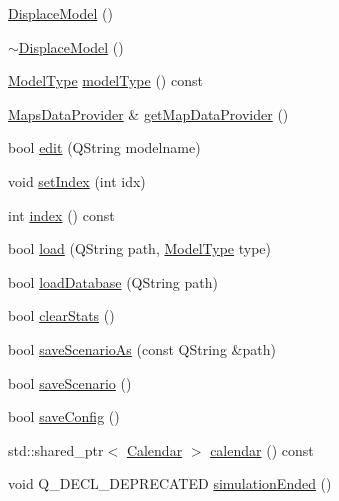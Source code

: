 \begin{DoxyCompactItemize}
\item 
\mbox{\hyperlink{class_displace_model_af29ae4dea3e66ed8a83200e6314cb12e}{Displace\+Model}} ()
\item 
\mbox{\hyperlink{class_displace_model_a2fd27dbc798b2037cb2edffd46d5126a}{$\sim$\+Displace\+Model}} ()
\item 
\mbox{\hyperlink{class_displace_model_aa89dfe820a935c7ec328dd8fc5c7c8cf}{Model\+Type}} \mbox{\hyperlink{class_displace_model_af2bf1482ae14c7edf00ef3a054af7f90}{model\+Type}} () const
\item 
\mbox{\hyperlink{class_maps_data_provider}{Maps\+Data\+Provider}} \& \mbox{\hyperlink{class_displace_model_a5cc5b78119476b37fecea821a50ccae6}{get\+Map\+Data\+Provider}} ()
\item 
bool \mbox{\hyperlink{class_displace_model_aa7fbc461966b5a61e8315a65d4b0c528}{edit}} (Q\+String modelname)
\item 
void \mbox{\hyperlink{class_displace_model_ac28610f27af7797d7d21937688c8d229}{set\+Index}} (int idx)
\item 
int \mbox{\hyperlink{class_displace_model_a7b72dd7bd7feb010720a35f080f23407}{index}} () const
\item 
bool \mbox{\hyperlink{class_displace_model_a50db8756e61d3c88daca0779c435191d}{load}} (Q\+String path, \mbox{\hyperlink{class_displace_model_aa89dfe820a935c7ec328dd8fc5c7c8cf}{Model\+Type}} type)
\item 
bool \mbox{\hyperlink{class_displace_model_aacd011e94f229ac288152fb3c84e3f6d}{load\+Database}} (Q\+String path)
\item 
bool \mbox{\hyperlink{class_displace_model_a98495a2be192880ddeb3778a42a0ef12}{clear\+Stats}} ()
\item 
bool \mbox{\hyperlink{class_displace_model_aac258d394fdf11f87788cc37c1ffaea4}{save\+Scenario\+As}} (const Q\+String \&path)
\item 
bool \mbox{\hyperlink{class_displace_model_a4843fe19a83911e237bf1077c8a11683}{save\+Scenario}} ()
\item 
bool \mbox{\hyperlink{class_displace_model_af9886ee44c007660e246b9e289f1fb20}{save\+Config}} ()
\item 
std\+::shared\+\_\+ptr$<$ \mbox{\hyperlink{class_calendar}{Calendar}} $>$ \mbox{\hyperlink{class_displace_model_adffd25632efe6d81c61b36582f693296}{calendar}} () const
\item 
void Q\+\_\+\+D\+E\+C\+L\+\_\+\+D\+E\+P\+R\+E\+C\+A\+T\+ED \mbox{\hyperlink{class_displace_model_a8629941afc5c45929ff2e9c940850ca7}{simulation\+Ended}} ()

\end{DoxyCompactItemize}
